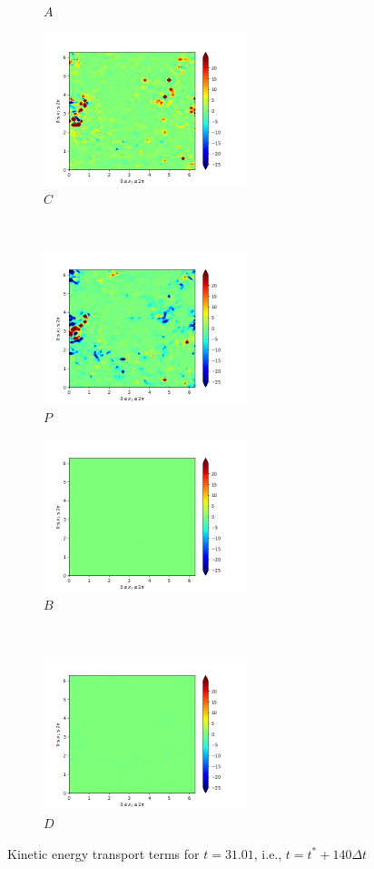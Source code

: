 \begin{figure}[H]
\begin{subfigure}{0.45\textwidth}
        \caption{$A$}
    \end{subfigure}
    \newline
    \begin{subfigure}{0.45\textwidth}
        \includegraphics[height=1.75in]{media/run-cds-65/C-ke-1480.png}
        \caption{$C$}
    \end{subfigure}
    ~
    \begin{subfigure}{0.45\textwidth}
        \includegraphics[height=1.75in]{media/run-cds-65/P-ke-1480.png}
        \caption{$P$}
    \end{subfigure}
    \newline
    \begin{subfigure}{0.45\textwidth}
        \includegraphics[height=1.75in]{media/run-cds-65/B-ke-1480.png}
        \caption{$B$}
    \end{subfigure}
    ~
    \begin{subfigure}{0.45\textwidth}
        \includegraphics[height=1.75in]{media/run-cds-65/D-ke-1480.png}
        \caption{$D$}
    \end{subfigure}
    \caption{Kinetic energy transport terms for $t=31.01$, i.e., $t=t^{\ast} + 140 \Delta t$}
\end{figure}
